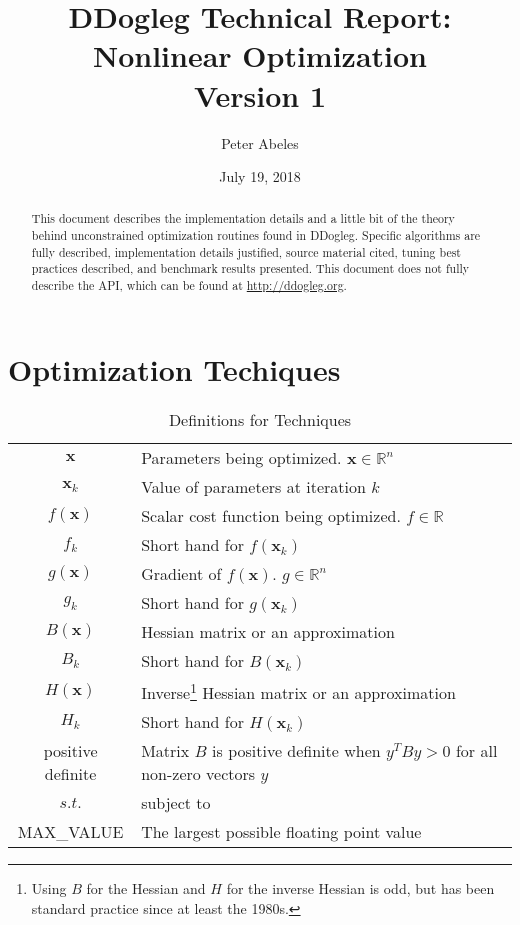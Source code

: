 \documentclass[peerreview,onecolumn]{IEEEtran}
\newcommand{\R}{\mathbb{R}}
\begin{document}
\title{DDogleg Technical Report: Nonlinear Optimization\\{\Large Version 1}}



\author{Peter Abeles}
\date{July 19, 2018}

\maketitle
\tableofcontents
\listoffigures
\listoftables

\IEEEpeerreviewmaketitle
\begin{abstract}
This document describes the implementation details and a little bit of the theory behind unconstrained optimization routines found in DDogleg. Specific algorithms are fully described, implementation details justified, source material cited, tuning best practices described, and benchmark results presented. This document does not fully describe the API, which can be found at \url{http://ddogleg.org}.
\end{abstract}


\section{Optimization Techiques}

\begin{table}[h]
\centering
\caption{\label{definitions:Techniques}Definitions for Techniques}
\begin{tabular}{cl}
$\bm{x}$ & Parameters being optimized. $\bm{x} \in \R^n$ \\
$\bm{x}_k$ & Value of parameters at iteration $k$ \\
$f(\bm{x})$ & Scalar cost function being optimized. $f \in \R$ \\
$f_k$ & Short hand for $f(\bm{x}_k)$ \\
$g(\bm{x})$ & Gradient of $f(\bm{x})$. $g \in \R^n$ \\
$g_k$ & Short hand for $g(\bm{x}_k)$ \\
$B(\bm{x})$ & Hessian matrix or an approximation \\ 
$B_k$ & Short hand for $B(\bm{x}_k)$ \\
$H(\bm{x})$ & Inverse\footnote{Using $B$ for the Hessian and $H$ for the inverse Hessian is odd, but has been standard practice since at least the 1980s.} Hessian matrix or an approximation \\ 
$H_k$ & Short hand for $H(\bm{x}_k)$ \\
positive definite & Matrix $B$ is positive definite when $y^T B y > 0$ for all non-zero vectors $y$  \\
$s.t.$ & subject to  \\
MAX\_VALUE & The largest possible floating point value
\end{tabular}
\end{table}
\end{document}
